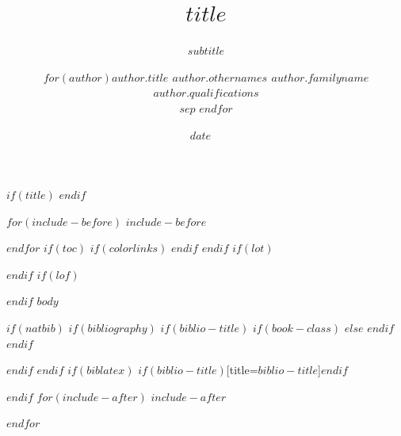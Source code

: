 \documentclass[$if(fontsize)$$fontsize$$else$11pt$endif$,$if(lang)$$babel-lang$,$endif$a4paper,$for(classoption)$$classoption$$sep$,$endfor$]{$documentclass$}
\title{$title$}
\subtitle{$subtitle$}
\institute{$for(institute)$$institute$$sep$ \and $endfor$}
\author{$for(author)$\sf\Large\textbf{$author.title$ $author.othernames$ $author.familyname$}\\ {\sf\large $author.qualifications$\\[0.5cm]}$sep$ $endfor$}
\date{$date$}
\date{\sf\Date~\Month~\Year}
\makeatletter
\def\titlepage{\front{\expandafter{\@title}}{\@author}{\@organization}}
\makeatother
\begin{document}
$if(title)$
\titlepage
$endif$

$for(include-before)$
$include-before$

$endfor$
$if(toc)$
{
$if(colorlinks)$
\hypersetup{linkcolor=$if(toccolor)$$toccolor$$else$black$endif$}
$endif$
\setcounter{tocdepth}{$toc-depth$}
\tableofcontents
}
$endif$
$if(lot)$
\listoftables
$endif$
$if(lof)$
\listoffigures
$endif$
$body$

$if(natbib)$
$if(bibliography)$
$if(biblio-title)$
$if(book-class)$
\renewcommand\bibname{$biblio-title$}
$else$
\renewcommand\refname{$biblio-title$}
$endif$
$endif$


$endif$
$endif$
$if(biblatex)$
\printbibliography$if(biblio-title)$[title=$biblio-title$]$endif$

$endif$
$for(include-after)$
$include-after$

$endfor$
\end{document}
